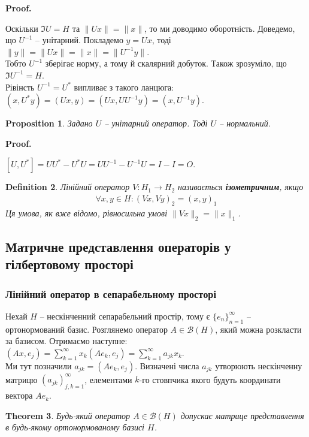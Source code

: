 \documentclass[a4paper, 10pt]{article}
\makeatletter
\theoremstyle{theoremdd}
\newtheorem{theorem}{Theorem}[subsection]
\theoremstyle{theoremdd}
\newtheorem{definition}[theorem]{Definition}
\theoremstyle{theoremdd}
\theoremstyle{theoremdd}
\theoremstyle{theoremdd}
\newtheorem{proposition}[theorem]{Proposition}
\theoremstyle{theoremdd}
\theoremstyle{theoremdd}
\theoremstyle{theoremdd}
\renewenvironment{proof}[1][Proof.\\]{\par
\pushQED{\hfill \qed}%
\normalfont \topsep6\p@\@plus6\p@\relax
\trivlist
\item\relax
{\bfseries
#1\@addpunct{.}}\hspace\labelsep\ignorespaces
}{%
\popQED\endtrivlist\@endpefalse
}
\makeatother
\begin{document}
\begin{proof}
Оскільки $\Im U = H$ та $\|Ux\| = \|x\|$, то ми доводимо оборотність. Доведемо, що $U^{-1}$ -- унітарний. Покладемо $y = Ux$, тоді\\
$\|y\| = \|Ux\| = \|x\| = \|U^{-1}y\|$.\\
Тобто $U^{-1}$ зберігає норму, а тому й скалярний добуток. Також зрозуміло, що $\Im U^{-1} = H$.\\
Рівінсть $U^{-1} = U^*$ випливає з такого ланцюга: $(x, U^*y) = (Ux,y) = (Ux, UU^{-1}y) = (x,U^{-1}y)$.
\end{proof}

\begin{proposition}
Задано $U$ -- унітарний оператор. Тоді $U$ -- нормальний.
\end{proposition}

\begin{proof}
$[U,U^*] = UU^* - U^*U = UU^{-1} - U^{-1}U = I - I = O$.
\end{proof}

\begin{definition}
Лінійний оператор $V \colon H_1 \to H_2$ називається \textbf{ізометричним}, якщо
\begin{align*}
\forall x,y \in H: (Vx,Vy)_2 = (x,y)_1
\end{align*}
Ця умова, як вже відомо, рівносильна умові $\|Vx\|_2 = \|x\|_1$.
\end{definition}

\subsection{Матричне представлення операторів у гілбертовому просторі}
\subsubsection{Лінійний оператор в сепарабельному просторі}
Нехай $H$ -- нескінченний сепарабельний простір, тому є $\{e_n\}_{n=1}^\infty$ -- ортонормований базис. Розглянемо оператор $A \in \mathcal{B}(H)$, який можна розкласти за базисом. Отримаємо наступне:\\
$(Ax, e_j) = \displaystyle\sum_{k=1}^\infty x_k (Ae_k, e_j) = \sum_{k=1}^\infty a_{jk} x_k$.\\
Ми тут позначили $a_{jk} = (Ae_k, e_j)$. Визначені числа $a_{jk}$ утворюють нескінченну матрицю $(a_{jk})_{j,k=1}^\infty$, елементами $k$-го стовпчика якого будуть координати вектора $Ae_k$.

\begin{theorem}
Будь-який оператор $A \in \mathcal{B}(H)$ допускає матрице представлення в будь-якому ортонормованому базисі $H$.
\end{theorem}
\end{document}
